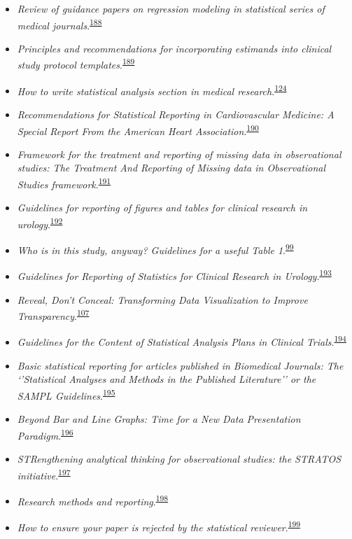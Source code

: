 \documentclass[
  a4paper,
]{book}
\begin{document}
\begin{itemize}
\item
  \emph{Review of guidance papers on regression modeling in statistical series of medical journals}.\textsuperscript{\protect\hyperlink{ref-Wallisch2022}{188}}
\item
  \emph{Principles and recommendations for incorporating estimands into clinical study protocol templates}.\textsuperscript{\protect\hyperlink{ref-Lynggaard2022}{189}}
\item
  \emph{How to write statistical analysis section in medical research}.\textsuperscript{\protect\hyperlink{ref-Dwivedi2022}{124}}
\item
  \emph{Recommendations for Statistical Reporting in Cardiovascular Medicine: A Special Report From the American Heart Association}.\textsuperscript{\protect\hyperlink{ref-Althouse2021}{190}}
\item
  \emph{Framework for the treatment and reporting of missing data in observational studies: The Treatment And Reporting of Missing data in Observational Studies framework}.\textsuperscript{\protect\hyperlink{ref-Lee2021}{191}}
\item
  \emph{Guidelines for reporting of figures and tables for clinical research in urology}.\textsuperscript{\protect\hyperlink{ref-Vickers2020}{192}}
\item
  \emph{Who is in this study, anyway? Guidelines for a useful Table 1}.\textsuperscript{\protect\hyperlink{ref-Hayes-Larson2019}{99}}
\item
  \emph{Guidelines for Reporting of Statistics for Clinical Research in Urology}.\textsuperscript{\protect\hyperlink{ref-assel2019}{193}}
\item
  \emph{Reveal, Don't Conceal: Transforming Data Visualization to Improve Transparency}.\textsuperscript{\protect\hyperlink{ref-Weissgerber2019}{107}}
\item
  \emph{Guidelines for the Content of Statistical Analysis Plans in Clinical Trials}.\textsuperscript{\protect\hyperlink{ref-Gamble2017}{194}}
\item
  \emph{Basic statistical reporting for articles published in Biomedical Journals: The `'Statistical Analyses and Methods in the Published Literature'' or the SAMPL Guidelines}.\textsuperscript{\protect\hyperlink{ref-Lang2015}{195}}
\item
  \emph{Beyond Bar and Line Graphs: Time for a New Data Presentation Paradigm}.\textsuperscript{\protect\hyperlink{ref-Weissgerber2015}{196}}
\item
  \emph{STRengthening analytical thinking for observational studies: the STRATOS initiative}.\textsuperscript{\protect\hyperlink{ref-Sauerbrei2014}{197}}
\item
  \emph{Research methods and reporting}.\textsuperscript{\protect\hyperlink{ref-groves2008}{198}}
\item
  \emph{How to ensure your paper is rejected by the statistical reviewer}.\textsuperscript{\protect\hyperlink{ref-stratton2005}{199}}
\end{itemize}
\end{document}
